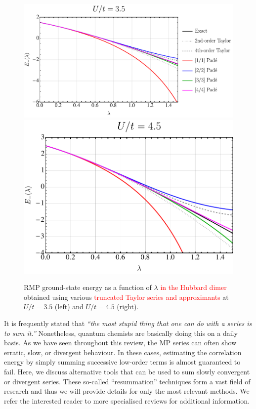 \documentclass[aps,prb,reprint,noshowkeys,superscriptaddress]{revtex4-1}
\newcommand{\titou}[1]{\textcolor{red}{#1}}
\begin{document}
\begin{figure}
    \includegraphics[height=0.23\textheight]{fig9a}
    \includegraphics[height=0.23\textheight]{fig9b}
    \caption{\label{fig:PadeRMP}
    RMP ground-state energy as a function of $\lambda$ \titou{in the Hubbard dimer} obtained using various \titou{truncated Taylor series and approximants} 
    at $U/t = 3.5$ (left) and $U/t = 4.5$ (right).}
\end{figure}


It is frequently stated that
\textit{``the most stupid thing that one can do with a series is to sum it.''}
Nonetheless, quantum chemists are basically doing this on a daily basis.
As we have seen throughout this review, the MP series can often show erratic, 
slow, or divergent behaviour.
In these cases, estimating the correlation energy by simply summing successive
low-order terms is almost guaranteed to fail.
Here, we discuss alternative tools that can be used to sum slowly convergent or divergent series.
These so-called ``resummation'' techniques form a vast field of research and thus we will
provide details for only the most relevant methods.
We refer the interested reader to more specialised reviews for additional information.%
\cite{Goodson_2011,Goodson_2019}
\end{document}
